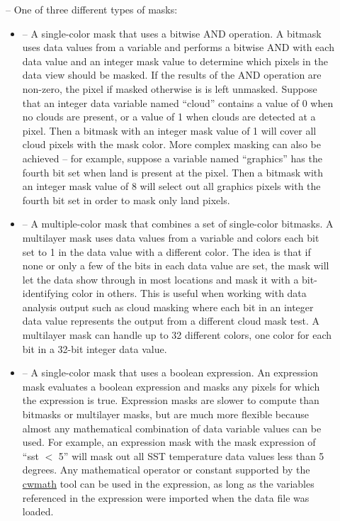 \begin{description}
\item[] -- One of three different types
of masks:
\begin{itemize}

  \item {} -- A single-color mask that
  uses a bitwise AND operation.  A bitmask uses data values from
  a variable and performs a bitwise AND with each data value and
  an integer mask value to determine which pixels in the data
  view should be masked.  If the results of the AND operation are
  non-zero, the pixel if masked otherwise is is left unmasked.
  Suppose that an integer data variable named ``cloud'' contains
  a value of 0 when no clouds are present, or a value of 1 when
  clouds are detected at a pixel.  Then a bitmask with an integer
  mask value of 1 will cover all cloud pixels with the mask
  color.  More complex masking can also be achieved -- for
  example, suppose a variable named ``graphics'' has the fourth
  bit set when land is present at the pixel.  Then a bitmask with
  an integer mask value of 8 will select out all graphics pixels
  with the fourth bit set in order to mask only land pixels.

  \item {} -- A multiple-color mask that
  combines a set of single-color bitmasks.  A multilayer mask
  uses data values from a variable and colors each bit set to 1
  in the data value with a different color.  The idea is that if
  none or only a few of the bits in each data value are set, the
  mask will let the data show through in most locations and mask
  it with a bit-identifying color in others.  This is useful when
  working with data analysis output such as cloud masking where
  each bit in an integer data value represents the output from a
  different cloud mask test.  A multilayer mask can handle up to
  32 different colors, one color for each bit in a 32-bit integer
  data value.

  \item {} -- A single-color
  mask that uses a boolean expression.  An expression mask
  evaluates a boolean expression and masks any pixels for which
  the expression is true.  Expression masks are slower to compute
  than bitmasks or multilayer masks, but are much more flexible
  because almost any mathematical combination of data variable
  values can be used.  For example, an expression mask with the
  mask expression of ``sst $<$ 5'' will mask out all SST
  temperature data values less than 5 degrees.  Any mathematical
  operator or constant supported by the
  \hyperlink{cwmath}{cwmath} tool can be used in the expression,
  as long as the variables referenced in the expression were
  imported when the data file was loaded.


\end{itemize}
\end{description}
